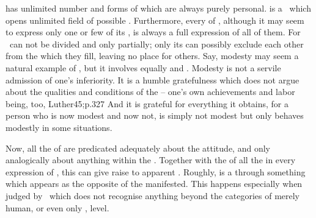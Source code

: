 \pa\label{pa:allaspects}  has unlimited number and forms of
 which are always purely personal.  is a 
\nexus\ which opens unlimited field of possible .
%
Furthermore, every  of , although it may
seem to express only one or few of its , is always a full expression
of all of them. For \nexus\ can not be divided and  only partially;
only its  can possibly exclude each other from the 
which they fill, leaving no place for others.  Say, modesty may seem a natural
example of , but it involves equally  and
. Modesty is not a servile admission of one's inferiority. It is a
humble gratefulness which does not argue about the qualities and conditions of
the  -- one's own achievements and labor being, too, \citet{nothing
  more than the finding and collecting of God's gifts.}{Luther}{45;p.327
  } And it is grateful for everything
it obtains, for a person who is now modest and now not, is simply not
modest but only behaves modestly in some situations.

\pa Now, all the  of  are predicated adequately about the
 attitude, and only analogically about anything within the
. Together with the  of all the  in
every expression of , this can give raise to apparent
. Roughly,  is a  through
something which appears as the opposite of the manifested. This happens
especially when judged by \No\ which does not recognise anything beyond the
 categories of merely human, or even only , level.

